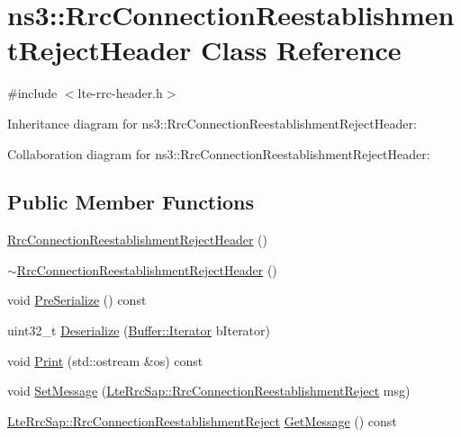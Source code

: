 \hypertarget{classns3_1_1RrcConnectionReestablishmentRejectHeader}{}\section{ns3\+:\+:Rrc\+Connection\+Reestablishment\+Reject\+Header Class Reference}
\label{classns3_1_1RrcConnectionReestablishmentRejectHeader}


{\ttfamily \#include $<$lte-\/rrc-\/header.\+h$>$}



Inheritance diagram for ns3\+:\+:Rrc\+Connection\+Reestablishment\+Reject\+Header\+:


Collaboration diagram for ns3\+:\+:Rrc\+Connection\+Reestablishment\+Reject\+Header\+:
\subsection*{Public Member Functions}
\begin{DoxyCompactItemize}
\item 
\hyperlink{classns3_1_1RrcConnectionReestablishmentRejectHeader_a211967a406af33a1acd993697598175b}{Rrc\+Connection\+Reestablishment\+Reject\+Header} ()
\item 
\hyperlink{classns3_1_1RrcConnectionReestablishmentRejectHeader_a9cd27aaf5150a5cbefbcb8a78b95efe8}{$\sim$\+Rrc\+Connection\+Reestablishment\+Reject\+Header} ()
\item 
void \hyperlink{classns3_1_1RrcConnectionReestablishmentRejectHeader_ab96aa4da7d49f520b0278234b33ffbab}{Pre\+Serialize} () const 
\item 
uint32\+\_\+t \hyperlink{classns3_1_1RrcConnectionReestablishmentRejectHeader_a660011621e8fcb43c5ea845469a9dedb}{Deserialize} (\hyperlink{classns3_1_1Buffer_1_1Iterator}{Buffer\+::\+Iterator} b\+Iterator)
\item 
void \hyperlink{classns3_1_1RrcConnectionReestablishmentRejectHeader_a17864ee6c171558054fd1aa15100959d}{Print} (std\+::ostream \&os) const 
\item 
void \hyperlink{classns3_1_1RrcConnectionReestablishmentRejectHeader_a033dcba1986039f07d8691e52d9360cd}{Set\+Message} (\hyperlink{structns3_1_1LteRrcSap_1_1RrcConnectionReestablishmentReject}{Lte\+Rrc\+Sap\+::\+Rrc\+Connection\+Reestablishment\+Reject} msg)
\item 
\hyperlink{structns3_1_1LteRrcSap_1_1RrcConnectionReestablishmentReject}{Lte\+Rrc\+Sap\+::\+Rrc\+Connection\+Reestablishment\+Reject} \hyperlink{classns3_1_1RrcConnectionReestablishmentRejectHeader_aa8008448982fb6bb8a8380514ebf97b0}{Get\+Message} () const 
\end{DoxyCompactItemize}
